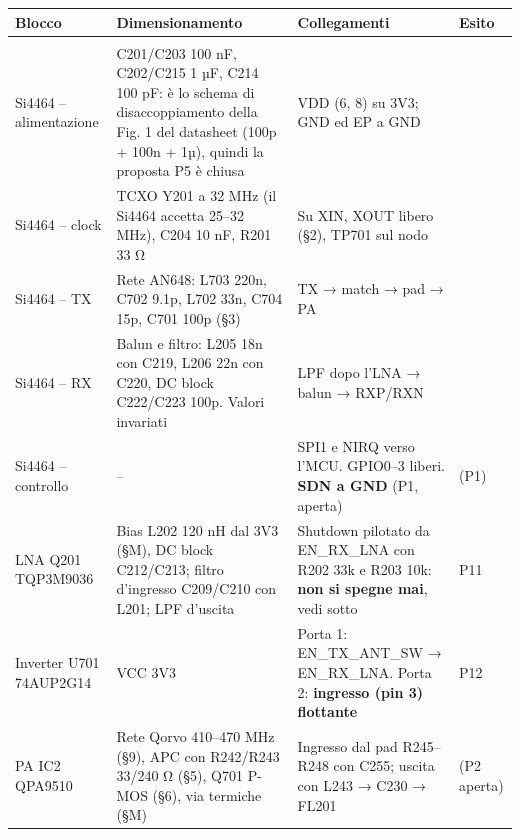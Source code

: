 {\footnotesize{}\setlength{\tabcolsep}{4pt}\renewcommand{\arraystretch}{1.1}
\begin{xltabular}{\linewidth}{>{\hsize\raggedright\arraybackslash}X>{\hsize\raggedright\arraybackslash}X>{\hsize\raggedright\arraybackslash}X>{\hsize\raggedright\arraybackslash}X}
\toprule
\textbf{Blocco} & \textbf{Dimensionamento} & \textbf{Collegamenti} & \textbf{Esito} \\
\midrule
\endhead
\midrule[0.15pt]\\\bottomrule\endfoot
\bottomrule\endlastfoot
Si4464 – alimentazione & C201/\allowbreak{}C203 100 nF, C202/\allowbreak{}C215 1 µF, C214 100 pF: è lo schema di disaccoppiamento della Fig. 1 del datasheet (100p + 100n + 1µ), quindi la proposta P5 è chiusa & VDD (6, 8) su 3V3; GND ed EP a GND &  \\\midrule[0.15pt]
Si4464 – clock & TCXO Y201 a 32 MHz (il Si4464 accetta 25–32 MHz), C204 10 nF, R201 33 Ω & Su XIN, XOUT libero (§2), TP701 sul nodo &  \\\midrule[0.15pt]
Si4464 – TX & Rete AN648: L703 220n, C702 9.1p, L702 33n, C704 15p, C701 100p (§3) & TX → match → pad → PA &  \\\midrule[0.15pt]
Si4464 – RX & Balun e filtro: L205 18n con C219, L206 22n con C220, DC block C222/\allowbreak{}C223 100p. Valori invariati & LPF dopo l'LNA → balun → RXP/\allowbreak{}RXN &  \\\midrule[0.15pt]
Si4464 – controllo & – & SPI1 e NIRQ verso l'MCU. GPIO0–3 liberi. \textbf{SDN a GND} (P1, aperta) &  (P1) \\\midrule[0.15pt]
LNA Q201 TQP3M9036 & Bias L202 120 nH dal 3V3 (§M), DC block C212/\allowbreak{}C213; filtro d'ingresso C209/\allowbreak{}C210 con L201; LPF d'uscita & Shutdown pilotato da EN\_\allowbreak{}RX\_\allowbreak{}LNA con R202 33k e R203 10k: \textbf{non si spegne mai}, vedi sotto &  P11 \\\midrule[0.15pt]
Inverter U701 74AUP2G14 & VCC 3V3 & Porta 1: EN\_\allowbreak{}TX\_\allowbreak{}ANT\_\allowbreak{}SW → EN\_\allowbreak{}RX\_\allowbreak{}LNA. Porta 2: \textbf{ingresso (pin 3) flottante} &  P12 \\\midrule[0.15pt]
PA IC2 QPA9510 & Rete Qorvo 410–470 MHz (§9), APC con R242/\allowbreak{}R243 33/\allowbreak{}240 Ω (§5), Q701 P-MOS (§6), via termiche (§M) & Ingresso dal pad R245–R248 con C255; uscita con L243 → C230 → FL201 &  (P2 aperta) \\\midrule[0.15pt]

\end{xltabular}}
